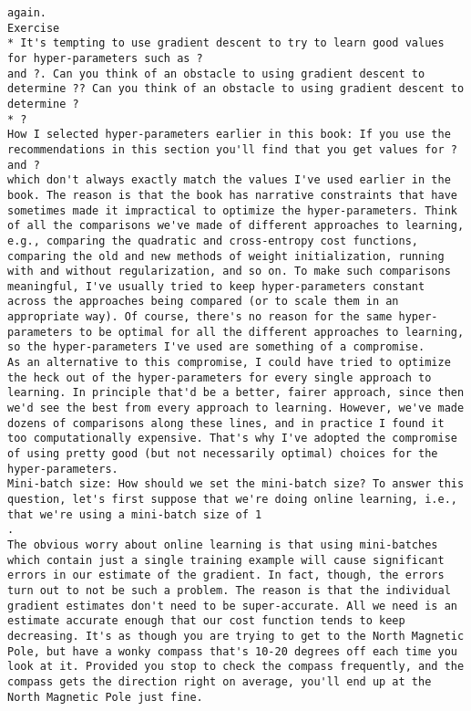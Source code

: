 \begin{lstlisting}
again.
Exercise
* It's tempting to use gradient descent to try to learn good values for hyper-parameters such as ?
and ?. Can you think of an obstacle to using gradient descent to determine ?? Can you think of an obstacle to using gradient descent to determine ?
* ? 
How I selected hyper-parameters earlier in this book: If you use the recommendations in this section you'll find that you get values for ?
and ?
which don't always exactly match the values I've used earlier in the book. The reason is that the book has narrative constraints that have sometimes made it impractical to optimize the hyper-parameters. Think of all the comparisons we've made of different approaches to learning, e.g., comparing the quadratic and cross-entropy cost functions, comparing the old and new methods of weight initialization, running with and without regularization, and so on. To make such comparisons meaningful, I've usually tried to keep hyper-parameters constant across the approaches being compared (or to scale them in an appropriate way). Of course, there's no reason for the same hyper-parameters to be optimal for all the different approaches to learning, so the hyper-parameters I've used are something of a compromise.
As an alternative to this compromise, I could have tried to optimize the heck out of the hyper-parameters for every single approach to learning. In principle that'd be a better, fairer approach, since then we'd see the best from every approach to learning. However, we've made dozens of comparisons along these lines, and in practice I found it too computationally expensive. That's why I've adopted the compromise of using pretty good (but not necessarily optimal) choices for the hyper-parameters.
Mini-batch size: How should we set the mini-batch size? To answer this question, let's first suppose that we're doing online learning, i.e., that we're using a mini-batch size of 1
.
The obvious worry about online learning is that using mini-batches which contain just a single training example will cause significant errors in our estimate of the gradient. In fact, though, the errors turn out to not be such a problem. The reason is that the individual gradient estimates don't need to be super-accurate. All we need is an estimate accurate enough that our cost function tends to keep decreasing. It's as though you are trying to get to the North Magnetic Pole, but have a wonky compass that's 10-20 degrees off each time you look at it. Provided you stop to check the compass frequently, and the compass gets the direction right on average, you'll end up at the North Magnetic Pole just fine.

\end{lstlisting}
